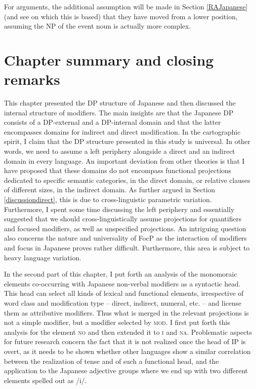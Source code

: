 For arguments, the additional assumption will be made in Section \ref{RAJapanese} (and see \citealt{laenzlinger:2005:french, laenzlinger:2011:elements} on which this is based) that they have moved from a lower position, assuming the NP of the event noun is actually more complex.


\section{Chapter summary and closing remarks}

This chapter presented the DP structure of Japanese and then discussed the internal structure of modifiers. The main insights are that the Japanese DP consists of a DP-external and a DP-internal domain and that the latter encompasses domains for indirect and direct modification. In the cartographic spirit, I claim that the DP structure presented in this study is universal. In other words, we need to assume a left periphery alongside a direct and an indirect domain in every language. An important deviation from other theories \citep{cinque:2010:adj, cinque:2020:relcl, scott:2002:stacked, laenzlinger:2005:french, laenzlinger:2011:elements, kim:2019:syntax} is that I have proposed that these domains do not encompass functional projections dedicated to specific semantic categories, in the direct domain, or relative clauses of different sizes, in the indirect domain. As further argued in Section \ref{discussiondirect}, this is due to cross-linguistic parametric variation. Furthermore, I spent some time discussing the left periphery and essentially suggested that we should cross-linguistically assume projections for quantifiers and focused modifiers, as well as unspecified projections. An intriguing question also concerns the nature and universality of FocP as the interaction of modifiers and focus in Japanese proves rather difficult. Furthermore, this area is subject to heavy language variation.

In the second part of this chapter, I put forth an analysis of the monomoraic elements co-occurring with Japanese non-verbal modifiers as a syntactic head. This head can select all kinds of lexical and functional elements, irrespective of word class and modification type -- direct, indirect, numeral, etc. -- and license them as attributive modifiers. Thus what is merged in the relevant projections is not a simple modifier, but a modifier selected by \textsc{mod}. I first put forth this analysis for the element \textsc{no} and then extended it to \textsc{i} and \textsc{na}. Problematic aspects for future research concern the fact that it is not realized once the head of IP is overt, as it needs to be shown whether other languages show a similar correlation between the realization of tense and of such a functional head, and the application to the Japanese adjective groups where we end up with two different elements spelled out as /i/.

